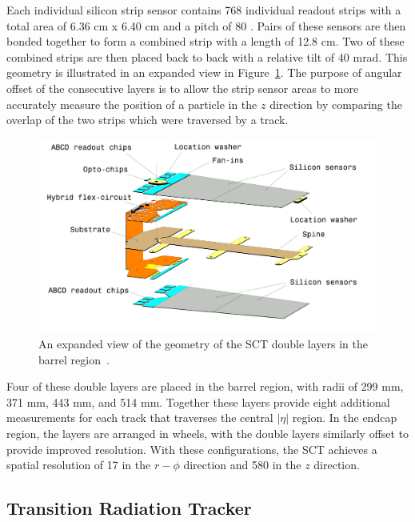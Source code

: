 Each individual silicon strip sensor contains 768 individual readout strips with a total area of 6.36 cm x 6.40 cm and a pitch of 80 \um. 
Pairs of these sensors are then bonded together to form a combined strip with a length of 12.8 cm.
Two of these combined strips are then placed back to back with a relative tilt of 40 mrad.
This geometry is illustrated in an expanded view in Figure~\ref{fig:sct_geometry}.
The purpose of angular offset of the consecutive layers is to allow the strip sensor areas to more accurately measure the position of a particle in the $z$ direction by comparing the overlap of the two strips which were traversed by a track.

\begin{figure}[hbtp]
\centering
\includegraphics[width=\fullfig]{figures/sct_geometry.png}
\caption{An expanded view of the geometry of the \acs*{SCT} double layers in the barrel region~\cite{atlas_experiment}.}
\label{fig:sct_geometry}
\end{figure}

Four of these double layers are placed in the barrel region, with radii of 299 mm, 371 mm, 443 mm, and 514 mm. 
Together these layers provide eight additional measurements for each track that traverses the central $|\eta|$ region.
In the endcap region, the layers are arranged in wheels, with the double layers similarly offset to provide improved resolution.
With these configurations, the \ac{SCT} achieves a spatial resolution of 17 \um in the $r-\phi$ direction and 580 \um in the $z$ direction.

\subsection{Transition Radiation Tracker}


